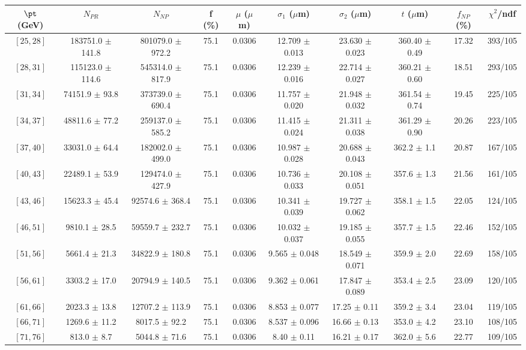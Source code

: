 \begin{tabular}{c||c|c|c|c|c|c|c||c|c}
$\pt$ (GeV) & $N_{PR}$ & $N_{NP}$ & f (\%) & $\mu$ ($\mu$m) & $\sigma_1$ ($\mu$m) & $\sigma_2$ ($\mu$m)  & $t$ ($\mu$m) & $f_{NP}$ (\%) & $\chi^2$/ndf \\
\hline
$[25, 28]$ & 183751.0 $\pm$ 141.8 & 801079.0 $\pm$ 972.2 & 75.1 & 0.0306 & 12.709 $\pm$ 0.013 & 23.630 $\pm$ 0.023 & 360.40 $\pm$ 0.49 & 17.32 & 393/105\\
$[28, 31]$ & 115123.0 $\pm$ 114.6 & 545314.0 $\pm$ 817.9 & 75.1 & 0.0306 & 12.239 $\pm$ 0.016 & 22.714 $\pm$ 0.027 & 360.21 $\pm$ 0.60 & 18.51 & 293/105\\
$[31, 34]$ & 74151.9 $\pm$ 93.8 & 373739.0 $\pm$ 690.4 & 75.1 & 0.0306 & 11.757 $\pm$ 0.020 & 21.948 $\pm$ 0.032 & 361.54 $\pm$ 0.74 & 19.45 & 225/105\\
$[34, 37]$ & 48811.6 $\pm$ 77.2 & 259137.0 $\pm$ 585.2 & 75.1 & 0.0306 & 11.415 $\pm$ 0.024 & 21.311 $\pm$ 0.038 & 361.29 $\pm$ 0.90 & 20.26 & 223/105\\
$[37, 40]$ & 33031.0 $\pm$ 64.4 & 182002.0 $\pm$ 499.0 & 75.1 & 0.0306 & 10.987 $\pm$ 0.028 & 20.688 $\pm$ 0.043 & 362.2 $\pm$ 1.1 & 20.87 & 167/105\\
$[40, 43]$ & 22489.1 $\pm$ 53.9 & 129474.0 $\pm$ 427.9 & 75.1 & 0.0306 & 10.736 $\pm$ 0.033 & 20.108 $\pm$ 0.051 & 357.6 $\pm$ 1.3 & 21.56 & 161/105\\
$[43, 46]$ & 15623.3 $\pm$ 45.4 & 92574.6 $\pm$ 368.4 & 75.1 & 0.0306 & 10.341 $\pm$ 0.039 & 19.727 $\pm$ 0.062 & 358.1 $\pm$ 1.5 & 22.05 & 124/105\\
$[46, 51]$ & 9810.1 $\pm$ 28.5 & 59559.7 $\pm$ 232.7 & 75.1 & 0.0306 & 10.032 $\pm$ 0.037 & 19.185 $\pm$ 0.055 & 357.7 $\pm$ 1.5 & 22.46 & 152/105\\
$[51, 56]$ & 5661.4 $\pm$ 21.3 & 34822.9 $\pm$ 180.8 & 75.1 & 0.0306 & 9.565 $\pm$ 0.048 & 18.549 $\pm$ 0.071 & 359.9 $\pm$ 2.0 & 22.69 & 158/105\\
$[56, 61]$ & 3303.2 $\pm$ 17.0 & 20794.9 $\pm$ 140.5 & 75.1 & 0.0306 & 9.362 $\pm$ 0.061 & 17.847 $\pm$ 0.089 & 353.4 $\pm$ 2.5 & 23.09 & 120/105\\
$[61, 66]$ & 2023.3 $\pm$ 13.8 & 12707.2 $\pm$ 113.9 & 75.1 & 0.0306 & 8.853 $\pm$ 0.077 & 17.25 $\pm$ 0.11 & 359.2 $\pm$ 3.4 & 23.04 & 119/105\\
$[66, 71]$ & 1269.6 $\pm$ 11.2 & 8017.5 $\pm$ 92.2 & 75.1 & 0.0306 & 8.537 $\pm$ 0.096 & 16.66 $\pm$ 0.13 & 353.0 $\pm$ 4.2 & 23.10 & 108/105\\
$[71, 76]$ & 813.0 $\pm$ 8.7 & 5044.8 $\pm$ 71.6 & 75.1 & 0.0306 & 8.40 $\pm$ 0.11 & 16.21 $\pm$ 0.17 & 362.0 $\pm$ 5.6 & 22.77 & 109/105\\

\end{tabular}
